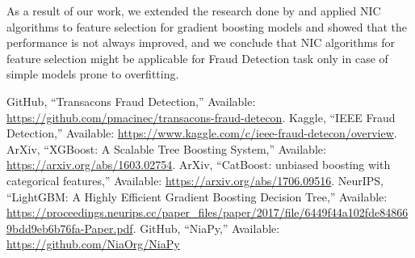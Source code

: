 \documentclass[conference]{IEEEtran}
\begin{document}
As a result of our work, we extended the research done by \cite{github}
and applied NIC algorithms to feature selection for gradient boosting
models and showed that the performance is not always improved,
and we conclude that NIC algorithms for feature selection
might be applicable for Fraud Detection task only in case of
simple models prone to overfitting.

\begin{thebibliography}{00}
	 GitHub, ``Transacons Fraud Detection,'' Available: \url{https://github.com/pmacinec/transacons-fraud-detecon}.
	 Kaggle, ``IEEE Fraud Detection,'' Available: \url{https://www.kaggle.com/c/ieee-fraud-detecon/overview}.
	 ArXiv, ``XGBoost: A Scalable Tree Boosting System,'' Available: \url{https://arxiv.org/abs/1603.02754}.
	 ArXiv, ``CatBoost: unbiased boosting with categorical features,'' Available: \url{https://arxiv.org/abs/1706.09516}.
	 NeurIPS, ``LightGBM: A Highly Efficient Gradient Boosting Decision Tree,'' Available: \url{https://proceedings.neurips.cc/paper_files/paper/2017/file/6449f44a102fde848669bdd9eb6b76fa-Paper.pdf}.
	 GitHub, ``NiaPy,'' Available: \url{https://github.com/NiaOrg/NiaPy}
\end{thebibliography}

\vspace{12pt}
\end{document}
